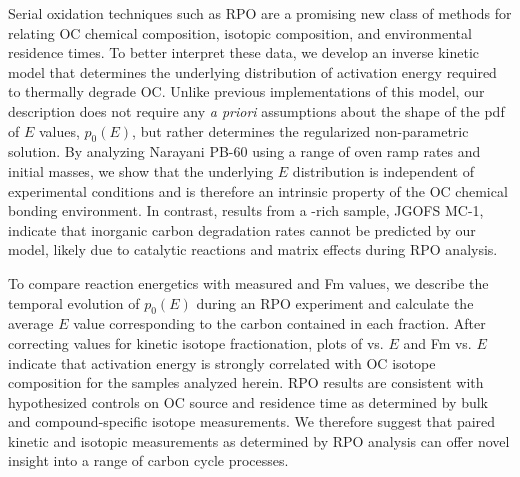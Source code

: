 Serial oxidation techniques such as RPO are a promising new class of methods for relating OC chemical composition, isotopic composition, and environmental residence times. To better interpret these data, we develop an inverse kinetic model that determines the underlying distribution of activation energy required to thermally degrade OC. Unlike previous implementations of this model, our description does not require any \textit{a priori} assumptions about the shape of the pdf of $E$ values, $p_{0}(E)$, but rather determines the regularized non-parametric solution. By analyzing Narayani PB-60 using a range of oven ramp rates and initial masses, we show that the underlying $E$ distribution is independent of experimental conditions and is therefore an intrinsic property of the OC chemical bonding environment. In contrast, results from a -rich sample, JGOFS MC-1, indicate that inorganic carbon degradation rates cannot be predicted by our model, likely due to catalytic reactions and matrix effects during RPO analysis.

To compare reaction energetics with measured  and Fm values, we describe the temporal evolution of $p_{0}(E)$ during an RPO experiment and calculate the average $E$ value corresponding to the carbon contained in each fraction. After correcting  values for kinetic isotope fractionation, plots of  vs. $E$ and Fm vs. $E$ indicate that activation energy is strongly correlated with OC isotope composition for the samples analyzed herein. RPO results are consistent with hypothesized controls on OC source and residence time as determined by bulk and compound-specific isotope measurements. We therefore suggest that paired kinetic and isotopic measurements as determined by RPO analysis can offer novel insight into a range of carbon cycle processes.




